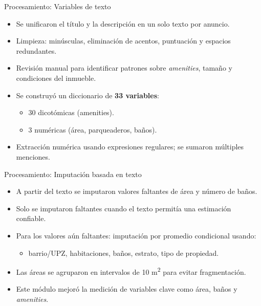 \documentclass[10pt]{beamer}
\begin{document}
\begin{frame}{Procesamiento: Variables de texto}
\begin{itemize}
    \item Se unificaron el título y la descripción en un solo texto por anuncio.
    \item Limpieza: minúsculas, eliminación de acentos, puntuación y espacios redundantes.
    \item Revisión manual para identificar patrones sobre \textit{amenities}, tamaño y condiciones del inmueble.
    \item Se construyó un diccionario de \textbf{33 variables}: 
    \begin{itemize}
        \item 30 dicotómicas (amenities).
        \item 3 numéricas (área, parqueaderos, baños).
    \end{itemize}
    \item Extracción numérica usando expresiones regulares; se sumaron múltiples menciones.
\end{itemize}
\end{frame}

\begin{frame}{Procesamiento: Imputación basada en texto}
\begin{itemize}
    \item A partir del texto se imputaron valores faltantes de área y número de baños.
    \item Solo se imputaron faltantes cuando el texto permitía una estimación confiable.
    \item Para los valores aún faltantes: imputación por promedio condicional usando:
    \begin{itemize}
        \item barrio/UPZ, habitaciones, baños, estrato, tipo de propiedad.
    \end{itemize}
    \item Las áreas se agruparon en intervalos de 10 m\textsuperscript{2} para evitar fragmentación.
    \item Este módulo mejoró la medición de variables clave como área, baños y \textit{amenities}.
\end{itemize}
\end{frame}
\end{document}
